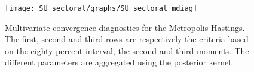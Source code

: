  
\begin{figure}[H]
\centering 
\texttt{[image: SU\_sectoral/graphs/SU\_sectoral\_mdiag]}
\caption{Multivariate convergence diagnostics for the Metropolis-Hastings.
The first, second and third rows are respectively the criteria based on
the eighty percent interval, the second and third moments. The different 
parameters are aggregated using the posterior kernel.}\label{Fig:MultivariateDiagnostics}
\end{figure}


